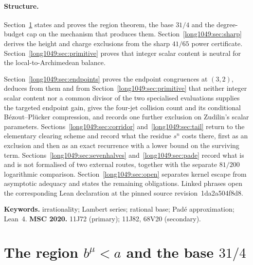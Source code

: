 \documentclass[11pt]{article}
\renewcommand{\commitshort}{1da2a504f8d8}
\begin{document}
\paragraph{Structure.}
Section~\ref{long1049:sec:region} states and proves the region theorem, the base $31/4$
and the degree-budget cap on the mechanism that produces them.
Section~\ref{long1049:sec:sharp} derives the height and charge exclusions from the sharp
$41/65$ power certificate.  Section~\ref{long1049:sec:primitive} proves that integer scalar content is neutral for the
local-to-Archimedean balance.

Section~\ref{long1049:sec:endpoints} proves the endpoint
congruences at $(3,2)$, deduces from them and from
Section~\ref{long1049:sec:primitive} that neither integer scalar content nor a common divisor
of the two specialised evaluations supplies the targeted endpoint gain, gives the
four-jet collision count and its conditional B\'ezout--Pl\"ucker compression, and records one further
exclusion on Zudilin's scalar parameters.
Sections~\ref{long1049:sec:corridor} and~\ref{long1049:sec:tail} return to the elementary
clearing scheme and record what the residue $s^{n}$ costs there, first as an
exclusion and then as an exact recurrence with a lower bound on the surviving
term.  Sections~\ref{long1049:sec:sevenhalves} and~\ref{long1049:sec:pade} record what is and is
not formalised of two external routes, together with the separate $81/200$
logarithmic comparison.  Section~\ref{long1049:sec:open} separates kernel escape from
asymptotic adequacy and states the remaining obligations.  Linked phrases open the corresponding Lean
declaration at the pinned source revision~\commitshort.

\medskip
\noindent\textbf{Keywords.} irrationality; Lambert series; rational base;
Pad\'e approximation; Lean~4.
\qquad
\textbf{MSC 2020.} 11J72 (primary); 11J82, 68V20 (secondary).

\section{The region \texorpdfstring{$b^{\mu}<a$}{b\textasciicircum mu < a} and the base \texorpdfstring{$31/4$}{31/4}}\label{long1049:sec:region}
\end{document}
